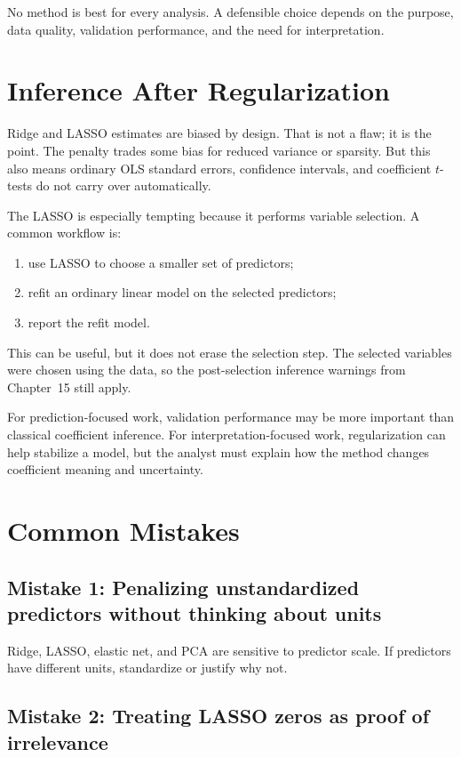 No method is best for every analysis.  A defensible choice depends on the purpose, data quality, validation performance, and the need for interpretation.

\section{Inference After Regularization}

Ridge and LASSO estimates are biased by design.  That is not a flaw; it is the point.  The penalty trades some bias for reduced variance or sparsity.  But this also means ordinary OLS standard errors, confidence intervals, and coefficient \(t\)-tests do not carry over automatically.

The LASSO is especially tempting because it performs variable selection.  A common workflow is:
\begin{enumerate}
  \item use LASSO to choose a smaller set of predictors;
  \item refit an ordinary linear model on the selected predictors;
  \item report the refit model.
\end{enumerate}
This can be useful, but it does not erase the selection step.  The selected variables were chosen using the data, so the post-selection inference warnings from Chapter~15 still apply.

For prediction-focused work, validation performance may be more important than classical coefficient inference.  For interpretation-focused work, regularization can help stabilize a model, but the analyst must explain how the method changes coefficient meaning and uncertainty.

\section{Common Mistakes}

\subsection*{Mistake 1: Penalizing unstandardized predictors without thinking about units}

Ridge, LASSO, elastic net, and PCA are sensitive to predictor scale.  If predictors have different units, standardize or justify why not.

\subsection*{Mistake 2: Treating LASSO zeros as proof of irrelevance}

